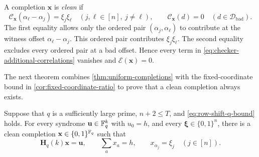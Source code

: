 A completion $\mathbf x$ is \emph{clean} if
\begin{equation}
\label{eq:enhanced-clean-correlations}
 \mathcal{C}_{\mathbf x}(\alpha_\ell-\alpha_j)=\xi_j\xi_\ell
 \quad(j,\ell\in[n],\ j\ne\ell),
 \qquad
 \mathcal{C}_{\mathbf x}(d)=0
 \quad(d\in\mathcal D_{\mathrm{bad}}).
\end{equation}
The first equality allows only the ordered pair
$(\alpha_j,\alpha_\ell)$ to contribute at the witness offset
$\alpha_\ell-\alpha_j$.  This ordered pair contributes $\xi_j\xi_\ell$.
The second equality excludes every ordered
pair at a bad offset.  Hence every term in
\cref{eq:checker-additional-correlations} vanishes and
$\mathcal E(\mathbf x)=0$.

The next theorem combines \cref{thm:uniform-completions} with the
fixed-coordinate bound in \cref{cor:fixed-coordinate-ratio} to prove that a
clean completion always exists.
\begin{theorem}
\label{thm:enhanced-clean}
Suppose that $q$ is a sufficiently large prime, $n+2\le T$,
and \mbox{\cref{eq:row-shift-q-bound}} holds.  For every syndrome
$\mathbf u\in\mathbb F_q^k$ with $u_0=h$, and every
$\boldsymbol\xi\in\{0,1\}^n$, there is a clean completion
$\mathbf x\in\{0,1\}^{\mathbb F_q}$ such that
\[
 \mathbf H_q(k)\mathbf x=\mathbf u,
 \qquad
 \sum_a x_a=h,
 \qquad
 x_{\alpha_j}=\xi_j\quad(j\in[n]).
\]
\end{theorem}


